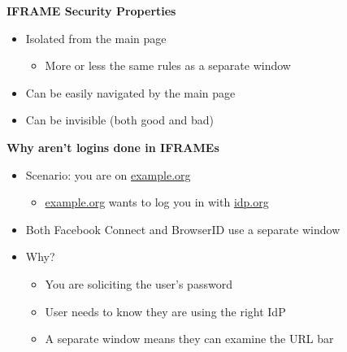 \documentclass[helvetica]{seminar}
\newcommand{\heading}[1]{%
  \begin{center} 
    \large\bf 
    #1 
  \end{center} 
  \vspace{.4 in}}
\begin{document}
\begin{slide}
\heading{IFRAME Security Properties}

\begin{itemize}
\item Isolated from the main page
  \begin{itemize}
  \item More or less the same rules as a separate window
  \end{itemize}

\item Can be easily navigated by the main page
\item Can be invisible (both good and bad)
\end{itemize}
\end{slide}


\begin{slide}
\heading{Why aren't logins done in IFRAMEs}

\begin{itemize}
\item Scenario: you are on \url{example.org}
  \begin{itemize}
  \item \url{example.org} wants to log you in with \url{idp.org}
  \end{itemize}

\item Both Facebook Connect and BrowserID use a separate window
\item Why?
  \begin{itemize}
  \item You are soliciting the user's password
  \item User needs to know they are using the right IdP
  \item A separate window means they can examine the URL bar
  \end{itemize}

\end{itemize}
\end{slide}
\end{document}
